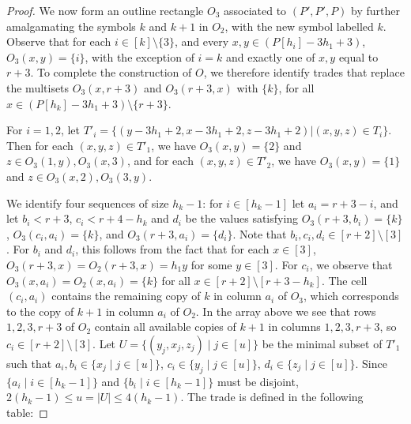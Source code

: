 \documentclass[10pt,a4paper]{amsart}
\begin{document}
\begin{proof}
    We now form an outline rectangle $O_3$ associated to $(P',P',P)$ by further amalgamating the symbols $k$ and $k+1$ in $O_2$, with the new symbol labelled $k$.
    Observe that for each $i \in [k]\setminus \{3\}$, and every $x,y\in (P[h_i]-3h_1+3)$, $O_3(x,y)=\{i\}$, with the exception of $i=k$ and exactly one of $x,y$ equal to $r+3$.
    To complete the construction of $O$, we therefore identify trades that replace the multisets $O_3(x,r+3)$ and $O_3(r+3,x)$ with $\{k\}$, for all $x \in (P[h_k]-3h_1+3) \setminus \{r+3\}$. 

    For $i=1,2$, let $T'_i = \{(y-3h_1+2,x-3h_1+2,z-3h_1+2) | (x,y,z) \in T_i\}$.
    Then for each $(x,y,z) \in T'_1$, we have $O_3(x,y)=\{2\}$ and $z \in O_3(1,y), O_3(x,3)$, and for each $(x,y,z) \in T'_2$, we have $O_3(x,y)=\{1\}$ and $z \in O_3(x,2), O_3(3,y)$.

    We identify four sequences of size $h_k-1$: for $i \in [h_k-1]$ let $a_{i} = r+3-i$, and let $b_i < r+3$, $c_i<r+4-h_k$ and $d_i$ be the values satisfying $O_3(r+3,b_i)=\{k\}$, $O_3(c_{i},a_{i})=\{k\}$, and $O_3(r+3,a_{i})=\{d_{i}\}$. Note that $b_i,c_i,d_i \in [r+2]\setminus [3]$. For $b_i$ and $d_i$, this follows from the fact that for each $x\in[3]$, $O_3(r+3,x)=O_2(r+3,x)=h_1{y}$ for some $y\in[3]$. For $c_i$, we observe that $O_3(x,a_i)=O_2(x,a_i)=\{k\}$ for all $x \in [r+2]\setminus [r+3-h_k]$. The cell $(c_i,a_i)$ contains the remaining copy of $k$ in column $a_i$ of $O_3$, which corresponds to the copy of $k+1$ in column $a_i$ of $O_2$. In the array above we see that rows $1,2,3,r+3$ of $O_2$ contain all available copies of $k+1$ in columns $1,2,3,r+3$, so $c_i\in [r+2]\setminus [3]$.
    Let $U = \{(y_j,x_j,z_j) \mid j \in [u]\}$ be the minimal subset of $T'_1$ such that $a_i, b_i \in \{x_j \mid j \in [u]\}$, $c_i \in \{y_j \mid j \in [u]\}$, $d_i \in \{z_j \mid j \in [u]\}$. Since $\{a_i \mid i \in [h_k-1]\}$ and $\{b_i \mid i \in [h_k-1]\}$ must be disjoint, $2(h_k-1) \le u=|U| \le 4(h_k-1)$. The trade is defined in the following table:
    \newline


\end{proof}
\end{document}
